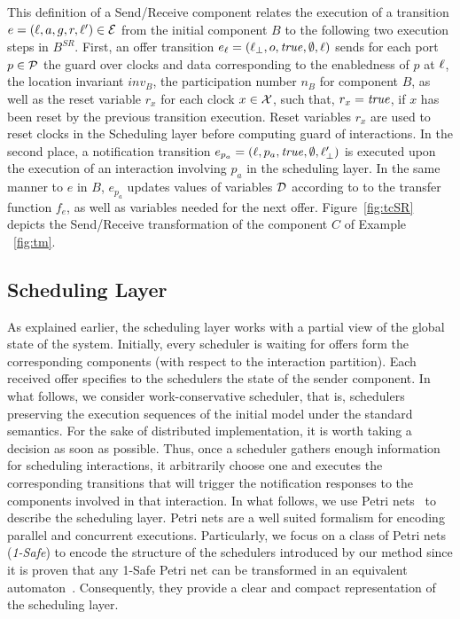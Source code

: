 This definition of a Send/Receive component relates the execution of a transition 
$e=(\ell,a,g,r,\ell')\in\mathcal{E}$ from the initial component $B$ to the following two 
execution steps in $B^{SR}$. First, an offer transition $e_{\ell}=(\ell_{\perp},o,\textnormal{\textit{true}},\emptyset,\ell)$
sends for each port $p\in\mathcal{P}$ the guard over clocks and data corresponding to the enabledness
of $p$ at $\ell$, the location invariant $inv_B$, the participation number $n_B$ for
component $B$, as well as the reset variable $r_x$ for each clock $x\in\mathcal{X}$, such that,
$r_x=\textnormal{\textit{true}}$, if $x$ has been reset by the previous transition execution. Reset variables
$r_x$ are used to reset clocks in the Scheduling layer before computing guard of interactions.
In the second place, a notification transition $e_{p_a}=(\ell,p_a,\textnormal{\textit{true}},\emptyset,\ell_{\perp}')$  
is executed upon the execution of an interaction involving $p_a$ in the scheduling layer. 
In the same manner to $e$ in $B$, $e_{p_a}$ updates values of variables $\mathcal{D}$ according to
to the transfer function $f_e$, as well as variables needed for the next offer. 
Figure~\ref{fig:tcSR} depicts the Send/Receive transformation of the component $C$ of Example
~\ref{fig:tm}.

\subsection{Scheduling Layer}
As explained earlier, the scheduling layer works with a partial view of the global state of 
the system. Initially, every scheduler is waiting for offers form the corresponding components
(with respect to the interaction partition). Each received offer specifies to the schedulers
the state of the sender component. In what follows, we consider work-conservative scheduler,
that is, schedulers preserving the execution sequences of the initial model under
the standard semantics. For the sake of distributed implementation, it is
worth taking a decision as soon as possible. Thus, once a scheduler gathers enough information 
for scheduling interactions, it arbitrarily choose one and executes the corresponding 
transitions that will trigger the notification responses to the components involved in 
that interaction.
In what follows, we use Petri nets~\cite{petri} to describe the scheduling layer. 
Petri nets are a well suited formalism for encoding parallel and concurrent executions. 
Particularly, we focus on a class of Petri nets (\emph{1-Safe}) to encode the structure of 
the schedulers introduced by our method since it is proven that any 1-Safe Petri net can be 
transformed in an equivalent automaton~\cite{petri2}. 
Consequently, they provide a clear and compact representation 
of the scheduling layer.

